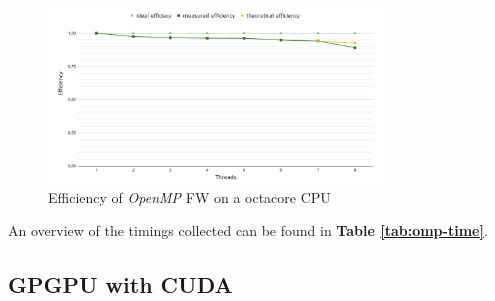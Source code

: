 \begin{figure}[h!]
\centering                                                                        
\includegraphics[width=3.5in]{diagrams/openmp-efficiency}
\captionsetup{justification=centering,margin=2cm}                                                                                                                                   
\caption{Efficiency of \emph{OpenMP} FW on a octacore CPU}                                                                                                                                            
\label{fig:omp-efficiency}                                                                                                                                                           
\end{figure}
An overview of the timings collected can be found in \textbf{Table \ref*{tab:omp-time}}.













































































\subsection{GPGPU with CUDA}